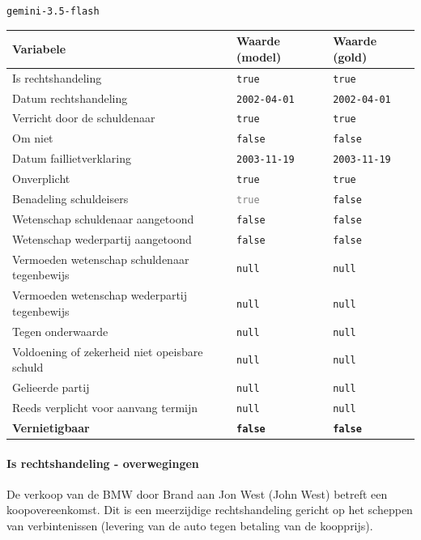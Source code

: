 \documentclass[
  dutch,
  a4paper,
]{article}
\begin{document}
\texttt{gemini-3.5-flash}

\begin{center}
\small
\begin{tabular}{@{}p{7.4cm}p{2.6cm}p{2.6cm}@{}}
\toprule
Variabele & Waarde (model) & Waarde (gold) \\
\midrule
Is rechtshandeling & \texttt{true} & \texttt{true} \\
Datum rechtshandeling & \texttt{2002-04-01} & \texttt{2002-04-01} \\
Verricht door de schuldenaar & \texttt{true} & \texttt{true} \\
Om niet & \texttt{false} & \texttt{false} \\
Datum faillietverklaring & \texttt{2003-11-19} & \texttt{2003-11-19} \\
Onverplicht & \texttt{true} & \texttt{true} \\
Benadeling schuldeisers & \textcolor{gray}{\texttt{true}} & \texttt{false} \\
Wetenschap schuldenaar aangetoond & \texttt{false} & \texttt{false} \\
Wetenschap wederpartij aangetoond & \texttt{false} & \texttt{false} \\
Vermoeden wetenschap schuldenaar tegenbewijs & \texttt{null} & \texttt{null} \\
Vermoeden wetenschap wederpartij tegenbewijs & \texttt{null} & \texttt{null} \\
Tegen onderwaarde & \texttt{null} & \texttt{null} \\
Voldoening of zekerheid niet opeisbare schuld & \texttt{null} & \texttt{null} \\
Gelieerde partij & \texttt{null} & \texttt{null} \\
Reeds verplicht voor aanvang termijn & \texttt{null} & \texttt{null} \\
\textbf{Vernietigbaar} & \textbf{\texttt{false}} & \textbf{\texttt{false}} \\
\bottomrule
\end{tabular}
\end{center}

\paragraph{Is rechtshandeling - overwegingen}\label{is-rechtshandeling---overwegingen-56}

De verkoop van de BMW door Brand aan Jon West (John West) betreft een koopovereenkomst. Dit is een meerzijdige rechtshandeling gericht op het scheppen van verbintenissen (levering van de auto tegen betaling van de koopprijs).
\end{document}
